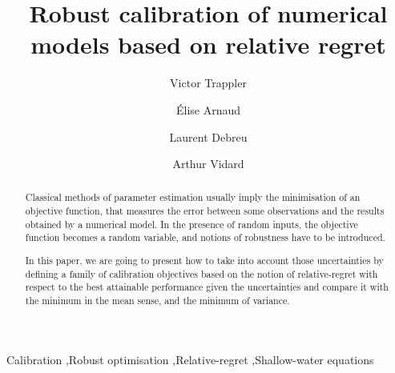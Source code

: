\documentclass[preprint, 1p]{elsarticle}
\begin{document}
\begin{frontmatter}

\title{Robust calibration of numerical models based on relative regret}%

\author[1]{Victor {Trappler}}
\author[1]{Élise {Arnaud}}
\author[2]{Laurent {Debreu}}
\author[2]{Arthur {Vidard}}

\address[1]{Univ. Grenoble Alpes, CNRS, Inria, Grenoble INP, LJK, 38000 Grenoble, France}
\address[2]{Univ. Grenoble Alpes, Inria, CNRS, Grenoble INP, LJK, 38000 Grenoble, France}

\begin{abstract}
Classical methods of parameter estimation usually imply the minimisation of an objective function, that measures the error between some observations and the results obtained by a numerical model. In the presence of random inputs, the objective function becomes a random variable, and notions of robustness have to be introduced.

In this paper, we are going to present how to take into account those uncertainties by defining a family of calibration objectives based on the notion of relative-regret with respect to the best attainable performance given the uncertainties and compare it with the minimum in the mean sense, and the minimum of variance.
\end{abstract}



\begin{keyword}
Calibration \sep Robust optimisation \sep Relative-regret \sep Shallow-water equations


\end{keyword}

\end{frontmatter}
\end{document}
